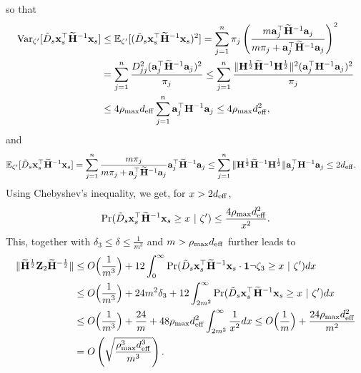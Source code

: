\documentclass[11pt,a4paper]{article}
\begin{document}
so that
\begin{align}
 \operatorname{Var}_{\zeta'}[\tilde D_{s}\mathbf{x}_s^\top\widetilde{\mathbf{H}}^{-1}\mathbf{x}_s] &\leq {\mathbb{E}}_{\zeta'}[(\tilde D_{s}\mathbf{x}_s^\top\widetilde{\mathbf{H}}^{-1}\mathbf{x}_s)^2]=\sum^n_{j=1}\pi_j\left(\frac{m\mathbf{a}_j^\top\widetilde{\mathbf{H}}^{-1}\mathbf{a}_j}{m\pi_j+\mathbf{a}_j^\top\widetilde{\mathbf{H}}^{-1}\mathbf{a}_j}\right)^2\nonumber\\
& =\sum^n_{j=1}\frac{D^2_{jj}(\mathbf{a}_j^\top\widetilde{\mathbf{H}}^{-1}\mathbf{a}_j)^2}{\pi_j}\leq\sum^n_{j=1}\frac{\|\mathbf{H}^{\frac{1}{2}}\widetilde{\mathbf{H}}^{-1}\mathbf{H}^{\frac{1}{2}}\|^2(\mathbf{a}_j^\top\mathbf{H}^{-1}\mathbf{a}_j)^2}{\pi_j}\nonumber\\
&\leq4\rho_{\max} d_{\mathrm{eff}}\sum^n_{j=1}\mathbf{a}_j^\top\mathbf{H}^{-1}\mathbf{a}_j\leq4\rho_{\max} d^2_{\mathrm{eff}},\nonumber
\end{align}
and 
\begin{align}
     {\mathbb{E}}_{\zeta'}[\tilde D_{s}\mathbf{x}_s^\top\widetilde{\mathbf{H}}^{-1}\mathbf{x}_s]&=\sum^n_{j=1}\frac{m\pi_j}{m\pi_j+\mathbf{a}_j^\top\widetilde{\mathbf{H}}^{-1}\mathbf{a}_j}\mathbf{a}_j^\top\widetilde{\mathbf{H}}^{-1}\mathbf{a}_j\leq  \sum^n_{j=1}\|\mathbf{H}^{\frac{1}{2}}\widetilde{\mathbf{H}}^{-1}\mathbf{H}^{\frac{1}{2}}\|\mathbf{a}_j^\top\mathbf{H}^{-1}\mathbf{a}_j \leq 2d_{\mathrm{eff}}.\nonumber
 \end{align}
Using Chebyshev's inequality, we get, for $x> 2d_{\mathrm{eff}}$,
\begin{align}
    \Pr(\tilde D_{s}\mathbf{x}_s^\top\widetilde{\mathbf{H}}^{-1}\mathbf{x}_s\geq x~|~\zeta')\leq\frac{4\rho_{\max} d^2_{\mathrm{eff}}}{x^2}. \nonumber
\end{align}
This, together with  $\delta_3\leq \delta\leq \frac{1}{m^3}$ and $m>\rho_{\max} d_{\mathrm{eff}}$ further leads to
\begin{align*}
   \|\widetilde{\mathbf{H}}^{\frac{1}{2}}\mathbf{Z}_2\widetilde{\mathbf{H}}^{-\frac{1}{2}}\|&\leq O\Big(\frac{1}{m^3}\Big)+  12\int^\infty_0 \Pr(\tilde D_{s}\mathbf{x}_s^\top\widetilde{\mathbf{H}}^{-1}\mathbf{x}_s\cdot \mathbf{1}\neg\zeta_3\geq x~|~\zeta')dx \\
    &\leq O\Big(\frac{1}{m^3}\Big)+24m^2\delta_3+12\int^\infty_{2m^2}\Pr(\tilde D_{s}\mathbf{x}_s^\top\widetilde{\mathbf{H}}^{-1}\mathbf{x}_s\geq x~|~\zeta')dx \\
    &\leq O\Big(\frac{1}{m^3}\Big)+\frac{24}{m}+ 48\rho_{\max} d^2_{\mathrm{eff}}\int^\infty_{2m^2}\frac{1}{x^2}dx\leq O\Big(\frac{1}{m}\Big)+\frac{24\rho_{\max} d^2_{\mathrm{eff}}}{m^2} \\ 
    &= O\left(\sqrt{\frac{\rho_{\max}^3 d^3_{\mathrm{eff}}}{m^3}}\right).
\end{align*}
\end{document}
